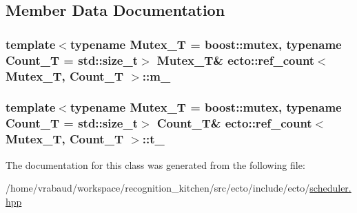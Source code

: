 \subsection{Member Data Documentation}
\hypertarget{classecto_1_1ref__count_a766db0f4309f593f6c3086a1ebead3a5}{
\subsubsection[{m\-\_\-}]{\setlength{\rightskip}{0pt plus 5cm}template$<$typename Mutex\-\_\-\-T  = boost\-::mutex, typename Count\-\_\-\-T  = std\-::size\-\_\-t$>$ Mutex\-\_\-\-T\& {\bf ecto\-::ref\-\_\-count}$<$ Mutex\-\_\-\-T, Count\-\_\-\-T $>$\-::m\-\_\-\hspace{0.3cm}{\ttfamily [private]}}}\label{classecto_1_1ref__count_a766db0f4309f593f6c3086a1ebead3a5}
\hypertarget{classecto_1_1ref__count_a689842816509f8f13710aee79b8c9898}{
\subsubsection[{t\-\_\-}]{\setlength{\rightskip}{0pt plus 5cm}template$<$typename Mutex\-\_\-\-T  = boost\-::mutex, typename Count\-\_\-\-T  = std\-::size\-\_\-t$>$ Count\-\_\-\-T\& {\bf ecto\-::ref\-\_\-count}$<$ Mutex\-\_\-\-T, Count\-\_\-\-T $>$\-::t\-\_\-\hspace{0.3cm}{\ttfamily [private]}}}\label{classecto_1_1ref__count_a689842816509f8f13710aee79b8c9898}


The documentation for this class was generated from the following file\-:\begin{DoxyCompactItemize}
\item 
/home/vrabaud/workspace/recognition\-\_\-kitchen/src/ecto/include/ecto/\hyperlink{scheduler_8hpp}{scheduler.\-hpp}\end{DoxyCompactItemize}

